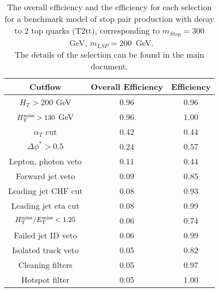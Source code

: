 \begin{longtable}{| c | c | c  | }
\caption{The overall efficiency and the efficiency for each selection for a benchmark model 
  of stop pair production with decay to 2 top quarks
  (T2tt), corresponding to $m_{Stop} = 300 $~GeV, $m_{LSP} = 200$~GeV. \\
  The details of the selection can be found in the main document. \label{tab:T2tt_300_200}} \\    \hline 
\textbf{Cutflow} & \textbf{Overall Efficiency} & \textbf{Efficiency}\\ \hline 
$H_{T} > 200$ GeV & 0.96 & 0.96\\ \hline 
$H_{\rm T}^{\rm miss} > 130$ GeV & 0.96 & 1.00\\ \hline 
$\alpha_{T}$ cut & 0.42 & 0.44\\ \hline 
$\Delta\phi^{*} > 0.5$ & 0.24 & 0.57\\ \hline 
Lepton, photon veto & 0.11 & 0.44\\ \hline 
Forward jet veto & 0.09 & 0.85\\ \hline 
Leading jet CHF cut & 0.08 & 0.93\\ \hline 
Leading jet eta cut & 0.08 & 0.99\\ \hline 
$H_{\rm T}^{\rm miss} / E_{\rm T}^{\rm miss} < 1.25$ & 0.06 & 0.74\\ \hline 
Failed jet ID veto & 0.06 & 0.99\\ \hline 
Isolated track veto & 0.05 & 0.82\\ \hline 
Cleaning filters & 0.05 & 0.97\\ \hline 
Hotspot filter & 0.05 & 1.00\\ \hline 
    \hline 
    \hline 
\end{longtable}
